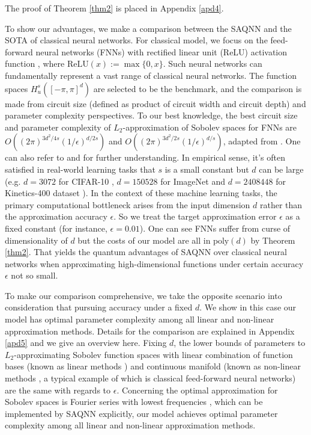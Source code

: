 \documentclass{article}
\theoremstyle{plain}
\theoremstyle{definition}
\theoremstyle{remark}
\begin{document}
The proof of Theorem \ref{thm2} is placed in Appendix \ref{apd4}. 


To show our advantages, we make a comparison between the SAQNN and the SOTA of classical neural networks. For classical model, we focus on the feed-forward neural networks (FNNs) \cite{Rumelhart1986,Bebis1994,svozil1997} with rectified linear unit (ReLU) activation function \cite{nair2010,glorot2011}, where $\text{ReLU}(x):=\max\{0,x\}$. Such neural networks can fundamentally represent a vast range of classical neural networks. The function spaces $H^s_u([-\pi,\pi]^d)$ are selected to be the benchmark, and the comparison is made from circuit size (defined as product of circuit width and circuit depth) and parameter complexity perspectives. To our best knowledge, the best circuit size and parameter complexity of $L_2$-approximation of Sobolev spaces for FNNs are $O((2\pi)^{3d^2/4s}(1/\epsilon)^{d/2s})$ and $O((2\pi)^{3d^2/2s}(1/\epsilon)^{d/s})$, adapted from \cite{yang2025}. One can also refer to \cite{lu2021} and \cite{Jiao2021} for further understanding. In empirical sense, it's often satisfied in real-world learning tasks that $s$ is a small constant but $d$ can be large (e.g. $d=3072$ for CIFAR-10 \cite{cifar10}, $d=150528$ for ImageNet \cite{imagenet} and $d=2408448$ for Kinetics-400 dataset \cite{Kinetics400}). In the context of these machine learning tasks, the primary computational bottleneck arises from the input dimension $d$ rather than the approximation accuracy $\epsilon$. So we treat the target approximation error $\epsilon$ as a fixed constant (for instance, $\epsilon=0.01$). One can see FNNs suffer from curse of dimensionality of $d$ but the costs of our model are all in $\text{poly}(d)$ by Theorem \ref{thm2}. That yields the quantum advantages of SAQNN over classical neural networks when approximating high-dimensional functions under certain accuracy $\epsilon$ not so small.

To make our comparison comprehensive, we take the opposite scenario into consideration that pursuing accuracy under a fixed $d$. We show in this case our model has optimal parameter complexity among all linear and non-linear approximation methods. Details for the comparison are explained in Appendix \ref{apd5} and we give an overview here. Fixing $d$, the lower bounds of parameters to $L_2$-approximating Sobolev function spaces with linear combination of function bases (known as linear methods \cite{pinkus2012}) and continuous manifold (known as non-linear methods \cite{devore1998}, a typical example of which is classical feed-forward neural networks) are the same with regards to $\epsilon$. Concerning the optimal approximation for Sobolev spaces is Fourier series with lowest frequencies \cite{mallat1999,pinkus2012}, which can be implemented by SAQNN explicitly, our model achieves optimal parameter complexity among all linear and non-linear approximation methods. 
\end{document}
